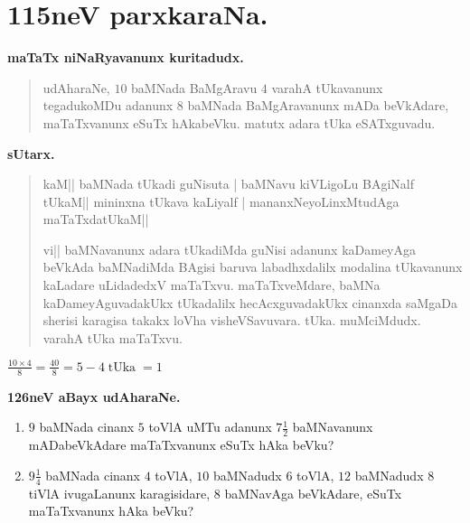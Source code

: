 \chapter{115neV parxkaraNa.}

\begin{center}
{\bf\large maTaTx niNaRyavanunx kuritadudx.}
\end{center}

\begin{verse}
udAharaNe, $10$ baMNada BaMgAravu $4$ varahA tUkavanunx tegadukoMDu adanunx $8$ baMNada BaMgAravanunx mADa beVkAdare, maTaTxvanunx eSuTx hAkabeVku. matutx adara tUka eSATxguvadu.
\end{verse}

\newpage

\begin{center}
{\bf\large sUtarx.}
\end{center}

\begin{verse}
kaM|| baMNada tUkadi guNisuta | baMNavu kiVLigoLu BAgiNalf tUkaM|| mininxna tUkava kaLiyalf | mananxNeyoLinxMtudAga maTaTxdatUkaM||

vi|| baMNavanunx adara tUkadiMda guNisi adanunx kaDameyAga beVkAda baMNadiMda BAgisi baruva labadhxdalilx modalina tUkavanunx kaLadare uLidadedxV maTaTxvu. maTaTxveMdare, baMNa kaDameyAguvadakUkx tUkadalilx hecAcxguvadakUkx cinanxda saMgaDa sherisi karagisa takakx loVha visheVSavuvara. tUka. muMciMdudx. varahA tUka maTaTxvu.
\end{verse}

\qq$\tfrac{10\times4}{8}=\tfrac{40}{8}=5-4\; \text{tUka}\;=1$

\begin{center}
{\bf\large 126neV aBayx udAharaNe.}
\end{center}

\begin{enumerate}[\rm (1)]
\item $9$ baMNada cinanx $5$ toVlA uMTu adanunx $7\tfrac{1}{2}$ baMNavanunx mADabeVkAdare maTaTxvanunx eSuTx hAka beVku?

\item $9\tfrac{1}{4}$ baMNada cinanx $4$ toVlA, $10$ baMNadudx $6$ toVlA, $12$ baMNadudx $8$ tiVlA ivugaLanunx karagisidare, $8$ baMNavAga beVkAdare, eSuTx maTaTxvanunx hAka beVku?
\end{enumerate}
